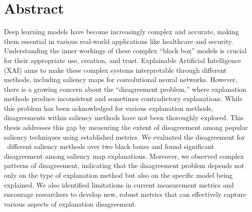 \chapter*{Abstract}
\label{abstract}
Deep learning models have become increasingly complex and accurate, making them essential in various real-world applications like healthcare and security. Understanding the inner workings of these complex ``black box'' models is crucial for their appropriate use, creation, and trust. Explainable Artificial Intelligence (XAI) aims to make these complex systems interpretable through different methods, including saliency maps for convolutional neural networks. However, there is a growing concern about the ``disagreement problem,'' where explanation methods produce inconsistent and sometimes contradictory explanations. While this problem has been acknowledged for various explanation methods, disagreements within saliency methods have not been thoroughly explored. This thesis addresses this gap by measuring the extent of disagreement among popular saliency techniques using established metrics. We evaluated the disagreement for \numExperimentedMethods\ different saliency methods over two black boxes and found significant disagreement among saliency map explanations. Moreover, we observed complex patterns of disagreement, indicating that the disagreement problem depends not only on the type of explanation method but also on the specific model being explained. We also identified limitations in current measurement metrics and encourage researchers to develop new, robust metrics that can effectively capture various aspects of explanation disagreement.